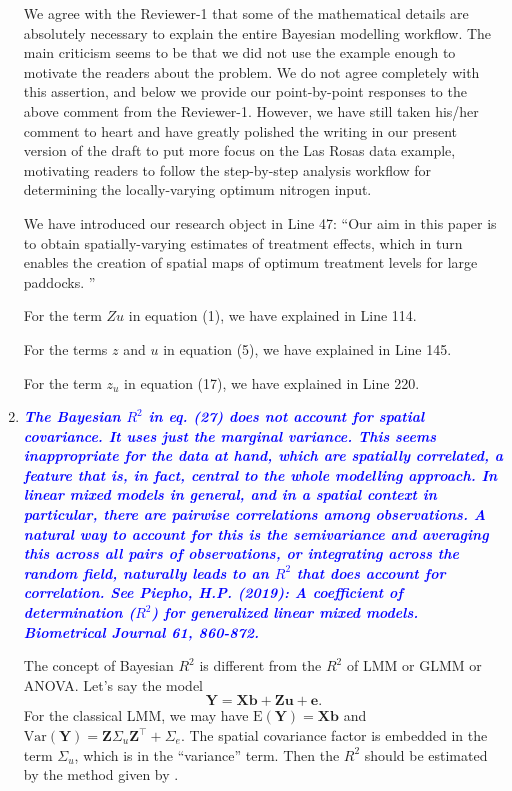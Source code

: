 \documentclass[a4paper]{article}   	%
\newcommand{\E}{\mathrm{E}}
\newcommand{\Var}{\mathrm{Var}}
\newcommand{\qtitle}[1]{\textit{\textbf{#1}}}
\begin{document}
\begin{enumerate}
    We agree with the Reviewer-1 that some of the mathematical details are absolutely necessary to explain the entire Bayesian modelling workflow. The main criticism seems to be that we did not use the example enough to motivate the readers about the problem. We do not agree completely with this assertion, and below we provide our point-by-point responses to the above comment from the Reviewer-1. However, we have still taken his/her comment to heart and have greatly polished the writing in our present version of the draft to put more focus on the Las Rosas data example, motivating readers to follow the step-by-step analysis workflow for determining the locally-varying optimum nitrogen input.   

    We have introduced our research object in Line 47: ``Our  aim  in  this  paper  is to  obtain  spatially-varying  estimates  of  treatment  effects,  which  in  turn  enables  the creation of spatial maps of optimum treatment levels for large paddocks. ''
    
    For the term $Zu$ in equation (1), we have explained in Line 114. 
    
    For the terms $z$ and $u$ in equation (5), we have explained in Line 145. 
    
    For the term $z_u$ in equation (17), we have explained in Line 220. 
    
    \item \qtitle{\textcolor{blue}{The Bayesian $R^2$ in eq. (27) does not account for spatial covariance. It uses just the marginal variance. This seems inappropriate for the data at hand, which are spatially correlated, a feature that is, in fact, central to the whole modelling approach. In linear mixed models in general, and in a spatial context in particular, there are pairwise correlations among observations. A natural way to account for this is the semivariance and averaging this across all pairs of observations, or integrating across the random field, naturally leads to an $R^2$ that does account for correlation. See Piepho, H.P. (2019): A coefficient of determination ($R^2$) for generalized linear mixed models. Biometrical Journal 61, 860-872.}}
        
    
    The concept of Bayesian $R^2$ is different from the $R^2$ of LMM or GLMM or ANOVA. Let's say the model
   	\begin{equation}\label{eq:modelmatrix}
    	\bm{Y} = \bm{X}\bm{b}+\bm{Z}\bm{u}+\bm{e}.
    \end{equation}
	For the classical LMM, we may have 
	$\E(\bm{Y}) = \bm{X}\bm{b}$ and $\Var(\bm{Y}) = \bm{Z}\Sigma_u\bm{Z}^\top+\Sigma_e$. The spatial covariance factor is embedded in the term $\Sigma_u$, which is in the ``variance'' term. Then the $R^2$ should be estimated by the method given by \textcite{Piepho2019Coefficient}. 
	

\end{enumerate}
\end{document}
